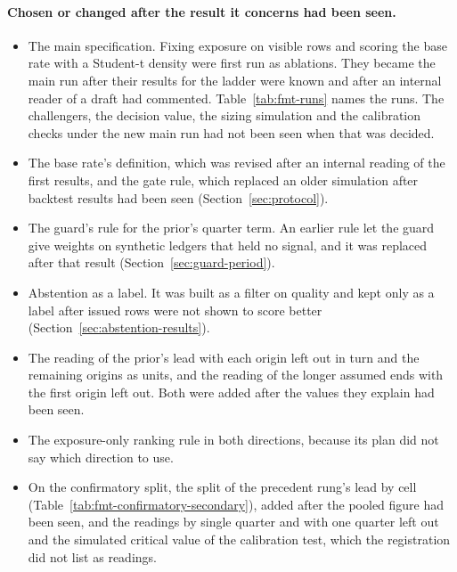 \paragraph{Chosen or changed after the result it concerns had been seen.}
\begin{itemize}
\item The main specification. Fixing exposure on visible rows and scoring the base rate with a Student-t density were first run as ablations. They became the main run after their results for the ladder were known and after an internal reader of a draft had commented. Table~\ref{tab:fmt-runs} names the runs. The challengers, the decision value, the sizing simulation and the calibration checks under the new main run had not been seen when that was decided.
\item The base rate's definition, which was revised after an internal reading of the first results, and the gate rule, which replaced an older simulation after backtest results had been seen (Section~\ref{sec:protocol}).
\item The guard's rule for the prior's quarter term. An earlier rule let the guard give weights on synthetic ledgers that held no signal, and it was replaced after that result (Section~\ref{sec:guard-period}).
\item Abstention as a label. It was built as a filter on quality and kept only as a label after issued rows were not shown to score better (Section~\ref{sec:abstention-results}).
\item The reading of the prior's lead with each origin left out in turn and the remaining origins as units, and the reading of the longer assumed ends with the first origin left out. Both were added after the values they explain had been seen.
\item The exposure-only ranking rule in both directions, because its plan did not say which direction to use.
\item On the confirmatory split, the split of the precedent rung's lead by cell (Table~\ref{tab:fmt-confirmatory-secondary}), added after the pooled figure had been seen, and the readings by single quarter and with one quarter left out and the simulated critical value of the calibration test, which the registration did not list as readings.

\end{itemize}
